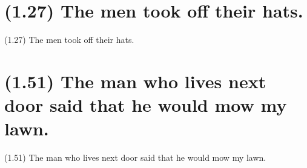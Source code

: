 \documentclass{article}
\begin{document}
\clearpage

%
%

\section*{(1.27) The men took off their hats.}

\bigbreak
\begin{enumerate*}
\item[(1.27)] The men took off their hats.
\end{enumerate*}
\bigbreak

\bigbreak
\begin{minipage}{\textwidth}
\end{minipage}
\bigbreak

\clearpage

%
%

\section*{(1.51) The man who lives next door said that he would mow my lawn.}

\bigbreak
\begin{enumerate*}
\item[(1.51)] The man who lives next door said that he would mow my lawn.
\end{enumerate*}
\bigbreak

\bigbreak
\begin{minipage}{\textwidth}
\end{minipage}
\bigbreak
\end{document}
